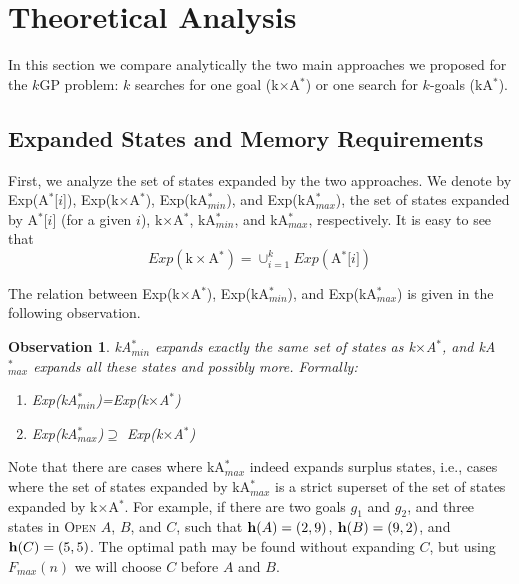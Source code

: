 \documentclass{aicom2e}
\newtheorem{observation}{Observation}
\newcommand{\kgs}{$k$GP}
\newcommand{\kastar}{kA$^*$}
\newcommand{\kastarmin}{kA$^*_{min}$}
\newcommand{\kastarmax}{kA$^*_{max}$}
\newcommand{\kxastar}{k$\times$A$^*$}
\newcommand{\astari}[1]{A$^*$[$#1$]}
\newcommand{\maxf}{$F_{max}(n)$}
\newcommand{\open}{\textsc{Open}}
\newcommand{\roni}[1]{\textbf{[RS:#1]}}
\begin{document}
\section{Theoretical Analysis}
\label{sec:theoretical-analysis}

In this section we compare analytically the two main approaches we proposed for
the \kgs{} problem: $k$ searches for one goal (\kxastar{}) or one search for
$k$-goals (\kastar{}).

\subsection{Expanded States and Memory Requirements}
First, we analyze the set of states expanded by the two approaches.
We denote by Exp(\astari{i}), Exp(\kxastar{}), Exp(\kastarmin), and Exp(\kastarmax),
the set of states expanded by \astari{i} (for a given $i$), \kxastar{}, \kastarmin, and \kastarmax{}, respectively. It is easy to see that
\[ Exp(\text{\kxastar{}})=\cup_{i=1}^k Exp(\text{\astari{i}}) \]

The relation between Exp(\kxastar{}), Exp(\kastarmin), and Exp(\kastarmax) is given in the following observation.
\begin{observation}
    \kastarmin{} expands exactly the same set of states as \kxastar{},
    and \kastarmax{} expands all these states and possibly more. Formally:
    \begin{enumerate}
        \item Exp(\kastarmin{})=Exp(\kxastar{})
        \item Exp(\kastarmax{})$\supseteq$ Exp(\kxastar{})
    \end{enumerate}
\label{obs:expandedStates}
\end{observation}

Note that there are cases where \kastarmax{} indeed expands surplus states, 
i.e., cases where the set of states
expanded by \kastarmax{} is a strict superset of the set of states expanded by
\kxastar{}. For example, if there are two goals $g_1$ and $g_2$, and three
states in \open{} $A$, $B$, and $C$, such that ${\bf h}(A)=(2,9)$, ${\bf
h}(B)=(9,2)$, and ${\bf h}(C)=(5,5)$. The optimal path may be found without
expanding $C$, but using \maxf{} we will choose $C$ before $A$ and $B$.


\end{document}
